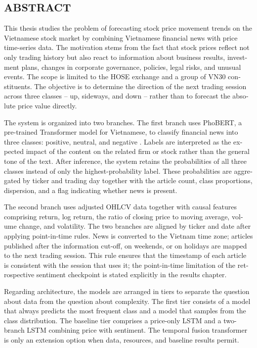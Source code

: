 \begin{otherlanguage}{english}
\chapter*{ABSTRACT}

This thesis studies the problem of forecasting stock price movement trends on the
Vietnamese stock market by combining Vietnamese financial news with price
time-series data. The motivation stems from the fact that stock prices reflect
not only trading history but also react to information about business results,
investment plans, changes in corporate governance, policies, legal risks, and
unusual events. The scope is limited to the HOSE exchange and a group of VN30
constituents. The objective is to determine the direction of the next trading
session across three classes -- up, sideways, and down -- rather than to forecast
the absolute price value directly.

The system is organized into two branches. The first branch uses PhoBERT, a
pre-trained Transformer model for Vietnamese, to classify financial news into
three classes: positive, neutral, and negative \cite{Nguyen2020_200300744v3}.
Labels are interpreted as the expected impact of the content on the related firm
or stock rather than the general tone of the text. After inference, the system
retains the probabilities of all three classes instead of only the
highest-probability label. These probabilities are aggregated by ticker and
trading day together with the article count, class proportions, dispersion, and
a flag indicating whether news is present.

The second branch uses adjusted OHLCV data together with causal features
comprising return, log return, the ratio of closing price to moving average,
volume change, and volatility. The two branches are aligned by ticker and date
after applying point-in-time rules. News is converted to the Vietnam time zone;
articles published after the information cut-off, on weekends, or on holidays are
mapped to the next trading session. This rule ensures that the timestamp of each
article is consistent with the session that uses it; the point-in-time limitation
of the retrospective sentiment checkpoint is stated explicitly in the results
chapter.

Regarding architecture, the models are arranged in tiers to separate the question
about data from the question about complexity. The first tier consists of a model
that always predicts the most frequent class and a model that samples from the
class distribution. The baseline tier comprises a price-only LSTM and a
two-branch LSTM combining price with sentiment. The temporal fusion transformer
is only an extension option when data, resources, and baseline results permit.


\end{otherlanguage}
